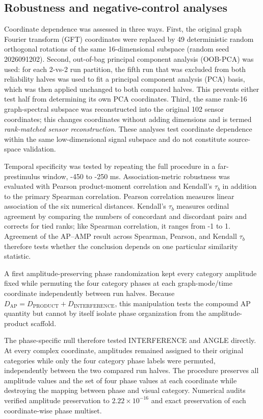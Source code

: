 \documentclass[11pt]{article}
\begin{document}
\subsection{Robustness and negative-control analyses}
Coordinate dependence was assessed in three ways. First, the original graph Fourier transform (GFT) coordinates were replaced by 49 deterministic random orthogonal rotations of the same 16-dimensional subspace (random seed 2026091202). Second, out-of-bag principal component analysis (OOB-PCA) was used: for each 2-vs-2 run partition, the fifth run that was excluded from both reliability halves was used to fit a principal component analysis (PCA) basis, which was then applied unchanged to both compared halves. This prevents either test half from determining its own PCA coordinates. Third, the same rank-16 graph-spectral subspace was reconstructed into the original 102 sensor coordinates; this changes coordinates without adding dimensions and is termed \emph{rank-matched sensor reconstruction}. These analyses test coordinate dependence within the same low-dimensional signal subspace and do not constitute source-space validation.

Temporal specificity was tested by repeating the full procedure in a far-prestimulus window, -450 to -250 ms. Association-metric robustness was evaluated with Pearson product-moment correlation and Kendall's $\tau_b$ in addition to the primary Spearman correlation. Pearson correlation measures linear association of the six numerical distances. Kendall's $\tau_b$ measures ordinal agreement by comparing the numbers of concordant and discordant pairs and corrects for tied ranks; like Spearman correlation, it ranges from -1 to 1. Agreement of the AP--AMP result across Spearman, Pearson, and Kendall $\tau_b$ therefore tests whether the conclusion depends on one particular similarity statistic.

A first amplitude-preserving phase randomization kept every category amplitude fixed while permuting the four category phases at each graph-mode/time coordinate independently between run halves. Because $D_{\mathrm{AP}}=D_{\mathrm{PRODUCT}}+D_{\mathrm{INTERFERENCE}}$, this manipulation tests the compound AP quantity but cannot by itself isolate phase organization from the amplitude-product scaffold.

The phase-specific null therefore tested INTERFERENCE and ANGLE directly. At every complex coordinate, amplitudes remained assigned to their original categories while only the four category phase labels were permuted, independently between the two compared run halves. The procedure preserves all amplitude values and the set of four phase values at each coordinate while destroying the mapping between phase and visual category. Numerical audits verified amplitude preservation to $2.22\times10^{-16}$ and exact preservation of each coordinate-wise phase multiset.
\end{document}
